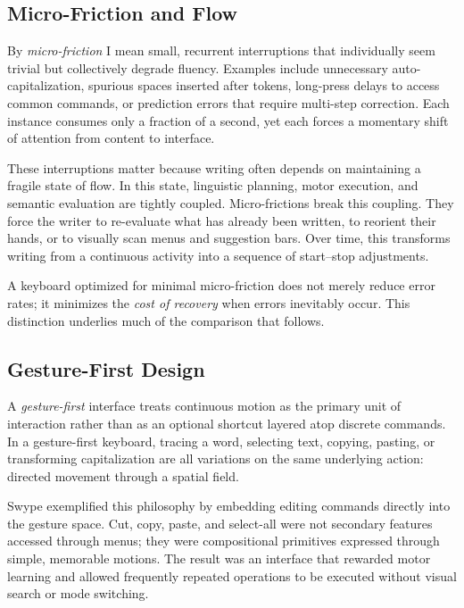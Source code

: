\documentclass[11pt]{article}
\begin{document}
\subsection{Micro-Friction and Flow}

By \emph{micro-friction} I mean small, recurrent interruptions that individually seem trivial but collectively degrade fluency. Examples include unnecessary auto-capitalization, spurious spaces inserted after tokens, long-press delays to access common commands, or prediction errors that require multi-step correction. Each instance consumes only a fraction of a second, yet each forces a momentary shift of attention from content to interface.

These interruptions matter because writing often depends on maintaining a fragile state of flow. In this state, linguistic planning, motor execution, and semantic evaluation are tightly coupled. Micro-frictions break this coupling. They force the writer to re-evaluate what has already been written, to reorient their hands, or to visually scan menus and suggestion bars. Over time, this transforms writing from a continuous activity into a sequence of start--stop adjustments.

A keyboard optimized for minimal micro-friction does not merely reduce error rates; it minimizes the \emph{cost of recovery} when errors inevitably occur. This distinction underlies much of the comparison that follows.

\subsection{Gesture-First Design}

A \emph{gesture-first} interface treats continuous motion as the primary unit of interaction rather than as an optional shortcut layered atop discrete commands. In a gesture-first keyboard, tracing a word, selecting text, copying, pasting, or transforming capitalization are all variations on the same underlying action: directed movement through a spatial field.

Swype exemplified this philosophy by embedding editing commands directly into the gesture space. Cut, copy, paste, and select-all were not secondary features accessed through menus; they were compositional primitives expressed through simple, memorable motions. The result was an interface that rewarded motor learning and allowed frequently repeated operations to be executed without visual search or mode switching.
\end{document}
